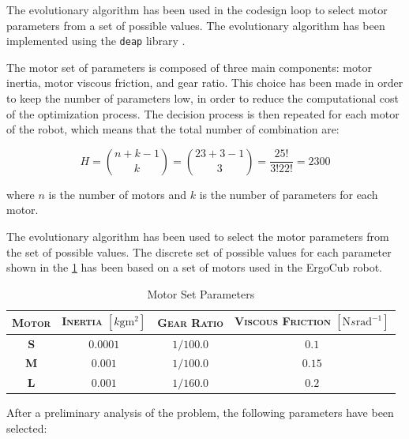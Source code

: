 The evolutionary algorithm has been used in the codesign loop to select motor parameters from a set of possible values. The evolutionary algorithm has been implemented using the \texttt{deap} library \citep{DEAP_JMLR2012}.

The motor set of parameters is composed of three main components: motor inertia, motor viscous friction, and gear ratio. This choice has been made in order to keep the number of parameters low, in order to reduce the computational cost of the optimization process. The decision process is then repeated for each motor of the robot, which means that the total number of combination are:

\begin{equation}
    H = \binom{n + k - 1}{k} = \binom{23 + 3 - 1}{3} = \frac{25!}{3! 22!} = 2300
\end{equation}

where $n$ is the number of motors and $k$ is the number of parameters for each motor.

The evolutionary algorithm has been used to select the motor parameters from the set of possible values. The discrete set of possible values for each parameter shown in the \cref{tab:motorparams} has been based on a set of motors used in the ErgoCub robot.

\begin{table}[h]
    \centering
    \begin{tabular}{c c c c}
        \toprule
        \textsc{Motor} & \textsc{Inertia} $[k\mathrm{gm}^2]$ & \textsc{Gear Ratio} & \textsc{Viscous Friction} $[\mathrm{N}s\mathrm{rad}^{-1}]$ \\
        \midrule
        \textbf{S}     & $0.0001$                            & $1/100.0$           & $0.1$                                                      \\
        \textbf{M}     & $0.001$                             & $1/100.0$           & $0.15$                                                     \\
        \textbf{L}     & $0.001$                             & $1/160.0$           & $0.2$                                                      \\
        \bottomrule
    \end{tabular}
    \caption{Motor Set Parameters}
    \label{tab:motorparams}
\end{table}


After a preliminary analysis of the problem, the following parameters have been selected:

